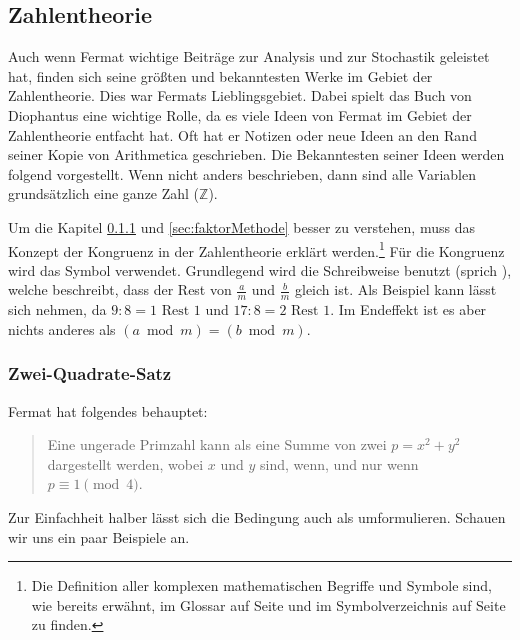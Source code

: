 \subsection{Zahlentheorie} \label{sec:zahlentheorie}
Auch wenn Fermat wichtige Beiträge zur Analysis und zur Stochastik geleistet hat, finden sich seine größten und bekanntesten Werke im Gebiet der \Gls{Zahlentheorie}. Dies war Fermats Lieblingsgebiet. Dabei spielt das Buch \textit{} von Diophantus eine wichtige Rolle, da es viele Ideen von Fermat im Gebiet der \Gls{Zahlentheorie} entfacht hat. Oft hat er Notizen oder neue Ideen an den Rand seiner Kopie von Arithmetica geschrieben. Die Bekanntesten seiner Ideen werden folgend vorgestellt. Wenn nicht anders beschrieben, dann sind alle Variablen grundsätzlich eine ganze Zahl ($\mathbb{Z}$).

Um die Kapitel \ref{sec:2sqr} und \ref{sec:faktorMethode} besser zu verstehen, muss das Konzept der \Gls{Kongruenz} in der \Gls{Zahlentheorie} erklärt werden.\footnote{Die Definition aller komplexen mathematischen Begriffe und Symbole sind, wie bereits erwähnt, im Glossar auf Seite \pageref{sec:glossary} und im Symbolverzeichnis auf Seite \pageref{sec:symb} zu finden.} Für die \Gls{Kongruenz} wird das Symbol  verwendet. Grundlegend wird die Schreibweise  benutzt (sprich ), welche beschreibt, dass der Rest von $\frac{a}{m}$ und $\frac{b}{m}$ gleich ist. Als Beispiel kann lässt sich  nehmen, da $9 : 8 = 1 \text{ Rest } 1$ und $17 : 8 = 2 \text{ Rest } 1$. Im Endeffekt ist es aber nichts anderes als $(a \bmod m) = (b \bmod m)$.

\subsubsection{Zwei-Quadrate-Satz} \label{sec:2sqr}
Fermat hat folgendes behauptet:

\begin{quote}
    Eine ungerade \Gls{Primzahl} kann als eine Summe von zwei  $p = x^2 + y^2$ dargestellt werden, wobei $x$ und $y$  sind, wenn, und nur wenn $p \equiv 1 \pmod{4}$.
\end{quote}

Zur Einfachheit halber lässt sich die Bedingung  auch als  umformulieren. Schauen wir uns ein paar Beispiele an.

